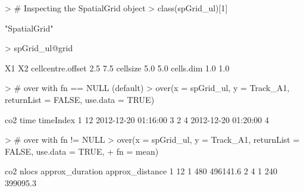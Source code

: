 \documentclass[12pt, oneside, a4paper]{scrbook}
\begin{document}
\begin{small}
\begin{Schunk}
\begin{Sinput}
> # Inspecting the SpatialGrid object
> class(spGrid_ul)[1]
\end{Sinput}
\begin{Soutput}
[1] "SpatialGrid"
\end{Soutput}
\begin{Sinput}
> spGrid_ul@grid
\end{Sinput}
\begin{Soutput}
                   X1  X2
cellcentre.offset 2.5 7.5
cellsize          5.0 5.0
cells.dim         1.0 1.0
\end{Soutput}
\begin{Sinput}
> # over with fn == NULL (default)
> over(x = spGrid_ul, y = Track_A1, returnList = FALSE, use.data = TRUE)
\end{Sinput}
\begin{Soutput}
  co2                time timeIndex
1  12 2012-12-20 01:16:00         3
2   4 2012-12-20 01:20:00         4
\end{Soutput}
\begin{Sinput}
> # over with fn != NULL
> over(x = spGrid_ul, y = Track_A1, returnList = FALSE, use.data = TRUE,
+      fn = mean)
\end{Sinput}
\begin{Soutput}
  co2 nlocs approx_duration approx_distance
1  12     1             480        496141.6
2   4     1             240        399095.3
\end{Soutput}
\end{Schunk}
\end{small}
\end{document}
